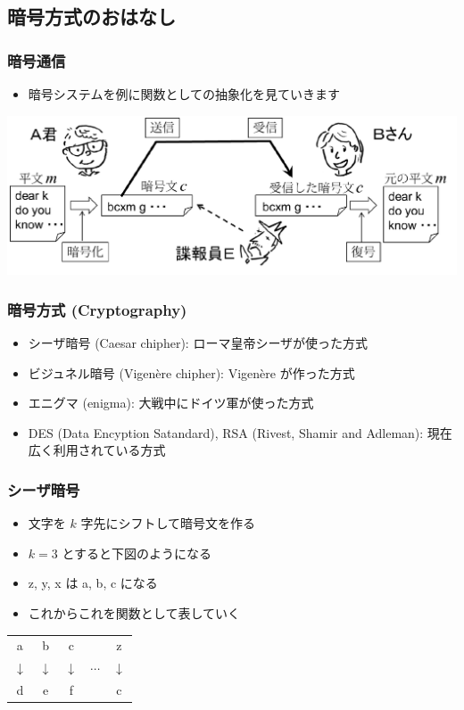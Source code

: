 \subsection{暗号方式のおはなし}
\begin{frame}[fragile]
\frametitle{暗号通信}
  \begin{itemize}
\item 暗号システムを例に関数としての抽象化を見ていきます
  \end{itemize}
  \begin{center}
\includegraphics[scale=0.3]{./Figure/elementaryCS-figAliceBob.pdf}
  \end{center}
\end{frame}
\begin{frame}[fragile]
\frametitle{暗号方式 (Cryptography)}
  \begin{itemize}
\item シーザ暗号 (Caesar chipher): ローマ皇帝シーザが使った方式
\item ビジュネル暗号 (Vigen\`{e}re chipher): Vigen\`{e}re が作った方式
\item エニグマ (enigma): 大戦中にドイツ軍が使った方式
\item DES (Data Encyption Satandard), RSA (Rivest, Shamir and Adleman): 現在広く利用されている方式
  \end{itemize}
\end{frame}
\begin{frame}[fragile]
\frametitle{シーザ暗号}
  \begin{itemize}
\item 文字を $k$ 字先にシフトして暗号文を作る
\item \(k=3\) とすると下図のようになる
\item z, y, x は a, b, c になる
\item これからこれを関数として表していく
  \end{itemize}
  \begin{center}
    \begin{tabular}{ccccc}
a & b & c && z\\
$\downarrow$&$\downarrow$&$\downarrow$&$\cdots$&$\downarrow$\\
d & e & f && c
    \end{tabular}
  \end{center}
\end{frame}
